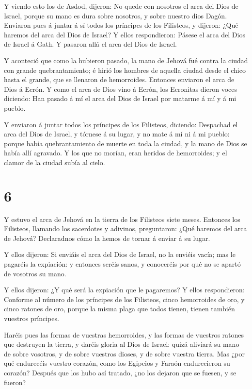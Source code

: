  Y viendo esto los de Asdod, dijeron: No quede con nosotros
el arca del Dios de Israel, porque su mano es dura sobre nosotros, y
sobre nuestro dios Dagón.  Enviaron pues á juntar á sí todos
los príncipes de los Filisteos, y dijeron: ¿Qué haremos del arca del
Dios de Israel? Y ellos respondieron: Pásese el arca del Dios de Israel
á Gath. Y pasaron allá el arca del Dios de Israel.

 Y aconteció que como la hubieron pasado, la mano de Jehová
fué contra la ciudad con grande quebrantamiento; é hirió los hombres de
aquella ciudad desde el chico hasta el grande, que se llenaron de
hemorroides.  Entonces enviaron el arca de Dios á Ecrón. Y
como el arca de Dios vino á Ecrón, los Ecronitas dieron voces diciendo:
Han pasado á mí el arca del Dios de Israel por matarme á mí y á mi
pueblo.

 Y enviaron á juntar todos los príncipes de los Filisteos,
diciendo: Despachad el arca del Dios de Israel, y tórnese á su lugar, y
no mate á mí ni á mi pueblo: porque había quebrantamiento de muerte en
toda la ciudad, y la mano de Dios se había allí agravado. 
Y los que no morían, eran heridos de hemorroides; y el clamor de la
ciudad subía al cielo.

\hypertarget{section-5}{%
\section{6}\label{section-5}}

 Y estuvo el arca de Jehová en la tierra de los Filisteos
siete meses.  Entonces los Filisteos, llamando los
sacerdotes y adivinos, preguntaron: ¿Qué haremos del arca de Jehová?
Declaradnos cómo la hemos de tornar á enviar á su lugar.

 Y ellos dijeron: Si enviáis el arca del Dios de Israel, no
la enviéis vacía; mas le pagaréis la expiación: y entonces seréis sanos,
y conoceréis por qué no se apartó de vosotros su mano.

 Y ellos dijeron: ¿Y qué será la expiación que le pagaremos?
Y ellos respondieron: Conforme al número de los príncipes de los
Filisteos, cinco hemorroides de oro, y cinco ratones de oro, porque la
misma plaga que todos tienen, tienen también vuestros príncipes.

 Haréis pues las formas de vuestras hemorroides, y las
formas de vuestros ratones que destruyen la tierra, y daréis gloria al
Dios de Israel: quizá aliviará su mano de sobre vosotros, y de sobre
vuestros dioses, y de sobre vuestra tierra.  Mas ¿por qué
endurecéis vuestro corazón, como los Egipcios y Faraón endurecieron su
corazón? Después que los hubo así tratado, ¿no los dejaron que se
fuesen, y se fueron?

